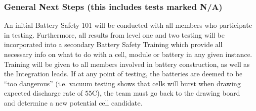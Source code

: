 \documentclass[main.tex]{subfiles}
\begin{document}
    \subsubsection{General Next Steps (this includes tests marked N/A)}
    An initial Battery Safety 101 will be conducted with all members who participate in testing. Furthermore, all results from level one and two testing will be incorporated into a secondary Battery Safety Training which provide all necessary info on what to do with a cell, module or battery in any given instance. Training will be given to all members involved in battery construction, as well as the Integration leads. If at any point of testing, the batteries are deemed to be “too dangerous” (i.e. vacuum testing shows that cells will burst when drawing expected discharge rate of 55C), the team must go back to the drawing board and determine a new potential cell candidate.
\end{document}
